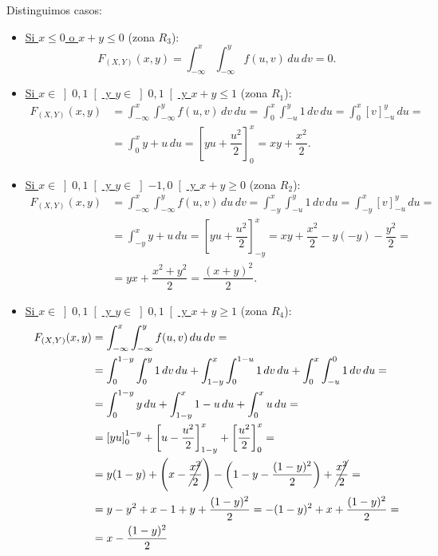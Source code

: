 \begin{ejercicio}
\begin{enumerate}
        Distinguimos casos:
        \begin{itemize}
            \item \ul{Si $x\leq 0$ \quad o \quad $x+y\leq 0$} (zona $R_3$):
            \begin{equation*}
                F_{(X,Y)}(x, y) = \int_{-\infty}^x \int_{-\infty}^y f(u, v) \, du \, dv = 0.
            \end{equation*}

            \item \ul{Si $x\in \left]0,1\right[$ \quad y \quad $y\in \left]0,1\right[$ \quad y \quad $x+y\leq 1$} (zona $R_1$):
            \begin{align*}
                F_{(X,Y)}(x, y) &= \int_{-\infty}^x \int_{-\infty}^y f(u, v) \, dv \, du = \int_{0}^x \int_{-u}^y 1 \, dv \, du = \int_{0}^x \left[v\right]_{-u}^y \, du
                =\\&= \int_{0}^x y+u \, du = \left[yu+\dfrac{u^2}{2}\right]_0^x = xy+\dfrac{x^2}{2}.
            \end{align*}

            \item \ul{Si $x\in \left]0,1\right[$ \quad y \quad $y\in \left]-1,0\right[$ \quad y \quad $x+y\geq 0$} (zona $R_2$):
            \begin{align*}
                F_{(X,Y)}(x, y) &= \int_{-\infty}^x \int_{-\infty}^y f(u, v) \, du \, dv = \int_{-y}^x \int_{-u}^y 1 \, dv \, du = \int_{-y}^x \left[v\right]_{-u}^y \, du
                =\\&= \int_{-y}^x y+u \, du = \left[yu+\dfrac{u^2}{2}\right]_{-y}^x = xy+\dfrac{x^2}{2}-y(-y)-\dfrac{y^2}{2}
                =\\&= yx+\dfrac{x^2+y^2}{2}=\dfrac{(x+y)^2}{2}.
            \end{align*}

            \item \ul{Si $x\in \left]0,1\right[$ \quad y \quad $y\in \left]0,1\right[$ \quad y \quad $x+y\geq 1$} (zona $R_4$):
            \begin{align*}
                F_{(X,Y)}(x, y) &= \int_{-\infty}^x \int_{-\infty}^y f(u, v) \, du \, dv
                =\\&= \int_{0}^{1-y} \int_{0}^y 1 \, dv \, du
                + \int_{1-y}^x \int_{0}^{1-u} 1 \, dv \, du
                + \int_{0}^{x} \int_{-u}^0 1 \, dv \, du
                =\\&= \int_{0}^{1-y} y  \, du
                + \int_{1-y}^x 1-u \, du
                + \int_{0}^{x} u\, du
                =\\&= \left[yu\right]_0^{1-y}
                + \left[u-\dfrac{u^2}{2}\right]_{1-y}^x
                + \left[\dfrac{u^2}{2}\right]_0^x
                =\\&= y(1-y)+\left(x-\cancel{\dfrac{x^2}{2}}\right)-\left(1-y-\dfrac{(1-y)^2}{2}\right)+\cancel{\dfrac{x^2}{2}}
                =\\&= y-y^2+x-1+y+\dfrac{(1-y)^2}{2}
                = -(1-y)^2+x +\dfrac{(1-y)^2}{2}
                =\\&= x -\dfrac{(1-y)^2}{2}
            \end{align*}


\end{itemize}
\end{enumerate}
\end{ejercicio}
